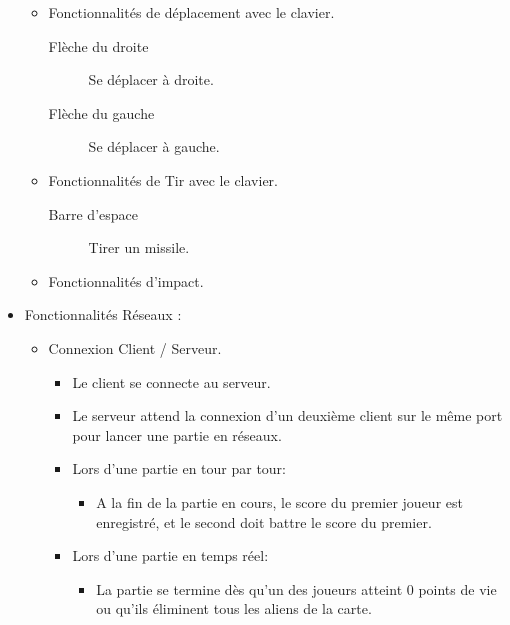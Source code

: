 \documentclass[french, 11pt]{article}
\begin{document}
\begin{itemize}
\begin{itemize}
					\item Fonctionnalités de déplacement avec le clavier.
					\begin{description}
						\item[Flèche du droite] Se déplacer à droite.
						\item[Flèche du gauche] Se déplacer à gauche.
					\end{description}
					\item Fonctionnalités de Tir avec le clavier.
					\begin{description}
						\item[Barre d'espace] Tirer un missile.
					\end{description}
					\item Fonctionnalités d’impact.
				\end{itemize}
				\item Fonctionnalités Réseaux :
				\begin{itemize}
					\item Connexion Client / Serveur.
					\begin{itemize}
						\item Le client se connecte au serveur.
						\item Le serveur attend la connexion d'un deuxième client sur le même port pour lancer une partie en réseaux.
						\item Lors d'une partie en tour par tour:
						\begin{itemize}
							\item A la fin de la partie en cours, le score du premier joueur est enregistré, et le second doit battre le score du premier.	
						\end{itemize}
						\item Lors d'une partie en temps réel:
						\begin{itemize}
							\item La partie se termine dès qu'un des joueurs atteint 0 points de vie ou qu'ils éliminent tous les aliens de la carte.

\end{itemize}
\end{itemize}
\end{itemize}
\end{itemize}
\end{document}
